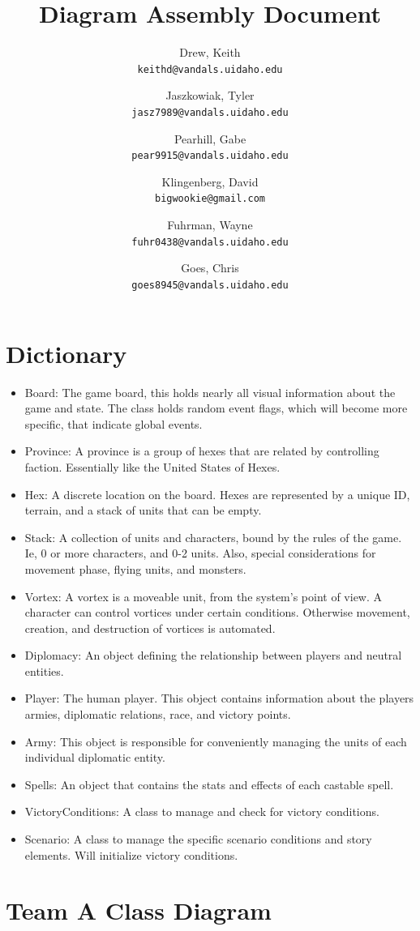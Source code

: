 \documentclass[10pt,a4paper]{article}
\author{
  Drew, Keith\\
  \texttt{keithd@vandals.uidaho.edu}
  \and
  Jaszkowiak, Tyler\\
  \texttt{jasz7989@vandals.uidaho.edu}
  \and
  Pearhill, Gabe\\
  \texttt{pear9915@vandals.uidaho.edu}
  \and
  Klingenberg, David\\
  \texttt{bigwookie@gmail.com}
  \and 
  Fuhrman, Wayne\\
  \texttt{fuhr0438@vandals.uidaho.edu}
  \and
  Goes, Chris\\
  \texttt{goes8945@vandals.uidaho.edu}
}
\title{Diagram Assembly Document}
\begin{document}
\maketitle
\section{Dictionary}
\begin{itemize}
\item Board: The game board, this holds nearly all visual information about the game and state. The class holds random event flags, which will become more specific, that indicate global events.
\item Province: A province is a group of hexes that are related by controlling faction. Essentially like the United States of Hexes. 
\item Hex: A discrete location on the board. Hexes are represented by a unique ID, terrain, and a stack of units that can be empty.
\item Stack: A collection of units and characters, bound by the rules of the game. Ie, 0 or more characters, and 0-2 units. Also, special considerations for movement phase, flying units, and monsters.
\item Vortex: A vortex is a moveable unit, from the system's point of view. A character can control vortices under certain conditions. Otherwise movement, creation, and destruction of vortices is automated.
\item Diplomacy: An object defining the relationship between players and neutral entities.
\item Player: The human player. This object contains information about the players armies, diplomatic relations, race, and victory points.
\item Army: This object is responsible for conveniently managing the units of each individual diplomatic entity.
\item Spells: An object that contains the stats and effects of each castable spell.
\item VictoryConditions: A class to manage and check for victory conditions. 
\item Scenario: A class to manage the specific scenario conditions and story elements. Will initialize victory conditions.
\end{itemize}

\pagebreak
\section{Team A Class Diagram}
\end{document}
